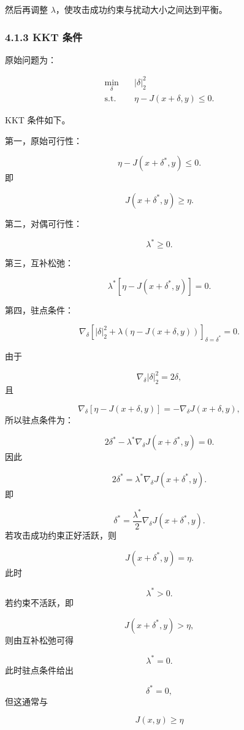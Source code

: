 ﻿\documentclass[UTF8,zihao=-4,fontset=none]{ctexart}
\begin{document}
然后再调整 \(\lambda\)，使攻击成功约束与扰动大小之间达到平衡。

\subsubsection*{4.1.3 KKT 条件}
{}

原始问题为：

\[
\begin{aligned}
\min_{\delta}
\quad
&
|\delta|_2^2\\
\mathrm{s.t.}
\quad
&
\eta-J(x+\delta,y)\le 0.
\end{aligned}
\]

KKT 条件如下。

第一，原始可行性：

\[
\eta-J(x+\delta^*,y)\le 0.
\]
\noindent 即

\[
J(x+\delta^*,y)\ge \eta.
\]

第二，对偶可行性：

\[
\lambda^*\ge 0.
\]

第三，互补松弛：

\[
\lambda^*
\left[
\eta-J(x+\delta^*,y)
\right]
=0.
\]

第四，驻点条件：

\[
\nabla_\delta
\left[
|\delta|_2^2
+
\lambda(\eta-J(x+\delta,y))
\right]_{\delta=\delta^*}
=0.
\]

由于

\[
\nabla_\delta|\delta|_2^2=2\delta,
\]
\noindent 且

\[
\nabla_\delta[\eta-J(x+\delta,y)]
=
-\nabla_\delta J(x+\delta,y),
\]
\noindent 所以驻点条件为：

\[
2\delta^*
-
\lambda^*\nabla_\delta J(x+\delta^*,y)
=
0.
\]
\noindent 因此

\[
2\delta^*
=
\lambda^*
\nabla_\delta J(x+\delta^*,y).
\]
\noindent 即

\[
\delta^*
=
\frac{\lambda^*}{2}
\nabla_\delta J(x+\delta^*,y).
\]
\noindent 若攻击成功约束正好活跃，则

\[
J(x+\delta^*,y)=\eta.
\]
\noindent 此时

\[
\lambda^*>0.
\]
\noindent 若约束不活跃，即

\[
J(x+\delta^*,y)>\eta,
\]
\noindent 则由互补松弛可得

\[
\lambda^*=0.
\]
\noindent 此时驻点条件给出

\[
\delta^*=0,
\]
\noindent 但这通常与

\[
J(x,y)\ge\eta
\]
\end{document}
